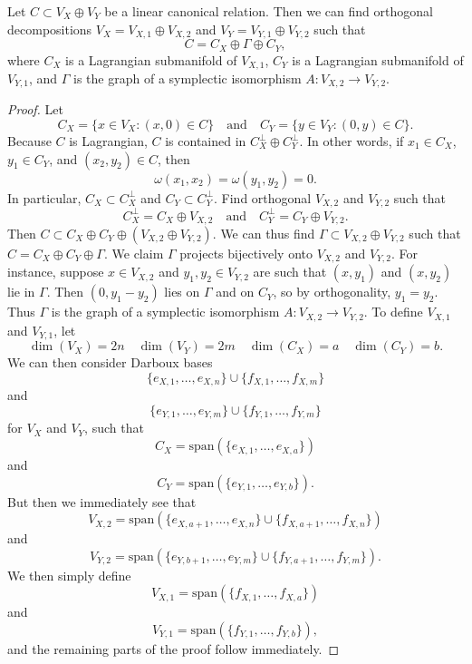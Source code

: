 \begin{lemma}
    Let $C \subset V_X \oplus V_Y$ be a linear canonical relation. Then we can find orthogonal decompositions $V_X = V_{X,1} \oplus V_{X,2}$ and $V_Y = V_{Y,1} \oplus V_{Y,2}$ such that
    \[ C = C_X \oplus \Gamma \oplus C_Y, \]
    where $C_X$ is a Lagrangian submanifold of $V_{X,1}$, $C_Y$ is a Lagrangian submanifold of $V_{Y,1}$, and $\Gamma$ is the graph of a symplectic isomorphism $A: V_{X,2} \to V_{Y,2}$.
\end{lemma}
\begin{proof}
    Let
    \[ C_X = \{ x \in V_X : (x,0) \in C \} \quad\text{and}\quad C_Y = \{ y \in V_Y : (0,y) \in C \}. \]
    Because $C$ is Lagrangian, $C$ is contained in $C_X^\perp \oplus C_Y^\perp$. In other words, if $x_1 \in C_X$, $y_1 \in C_Y$, and $(x_2,y_2) \in C$, then
    \[ \omega(x_1,x_2) = \omega(y_1,y_2) = 0. \]
    In particular, $C_X \subset C_X^\perp$ and $C_Y \subset C_Y^\perp$. Find orthogonal $V_{X,2}$ and $V_{Y,2}$ such that
    \[ C_X^\perp = C_X \oplus V_{X,2} \quad\text{and}\quad C_Y^\perp = C_Y \oplus V_{Y,2}. \]
    Then $C \subset C_X \oplus C_Y \oplus (V_{X,2} \oplus V_{Y,2})$. We can thus find $\Gamma \subset V_{X,2} \oplus V_{Y,2}$ such that $C = C_X \oplus C_Y \oplus \Gamma$. We claim $\Gamma$ projects bijectively onto $V_{X,2}$ and $V_{Y,2}$. For instance, suppose $x \in V_{X,2}$ and $y_1,y_2 \in V_{Y,2}$ are such that $(x,y_1)$ and $(x,y_2)$ lie in $\Gamma$. Then $(0,y_1 - y_2)$ lies on $\Gamma$ and on $C_Y$, so by orthogonality, $y_1 = y_2$. Thus $\Gamma$ is the graph of a symplectic isomorphism $A:V_{X,2} \to V_{Y,2}$. To define $V_{X,1}$ and $V_{Y,1}$, let
    \[ \dim(V_X) = 2n \quad \dim(V_Y) = 2m \quad \dim(C_X) = a \quad \dim(C_Y) = b. \]
    We can then consider Darboux bases
    \[ \{ e_{X,1}, \dots, e_{X,n} \} \cup \{ f_{X,1}, \dots, f_{X,m} \} \]
    and
    \[ \{ e_{Y,1}, \dots, e_{Y,m} \} \cup \{ f_{Y,1}, \dots, f_{Y,m} \} \]
    for $V_X$ and $V_Y$, such that
    \[ C_X = \text{span} ( \{ e_{X,1}, \dots, e_{X,a} \} ) \]
    and
    \[ C_Y = \text{span} ( \{ e_{Y,1}, \dots, e_{Y,b} \} ). \]
    But then we immediately see that
    \[ V_{X,2} = \text{span}( \{ e_{X,a+1}, \dots, e_{X,n} \} \cup \{ f_{X,a+1}, \dots, f_{X,n} \} ) \]
    and
    \[ V_{Y,2} = \text{span}( \{ e_{Y,b+1}, \dots, e_{Y,m} \} \cup \{ f_{Y,a+1}, \dots, f_{Y,m} \} ). \]
    We then simply define
    \[ V_{X,1} = \text{span}( \{ f_{X,1}, \dots, f_{X,a} \}  ) \]
    and
    \[ V_{Y,1} = \text{span}( \{ f_{Y,1}, \dots, f_{Y,b} \} ), \]
    and the remaining parts of the proof follow immediately.
\end{proof}

